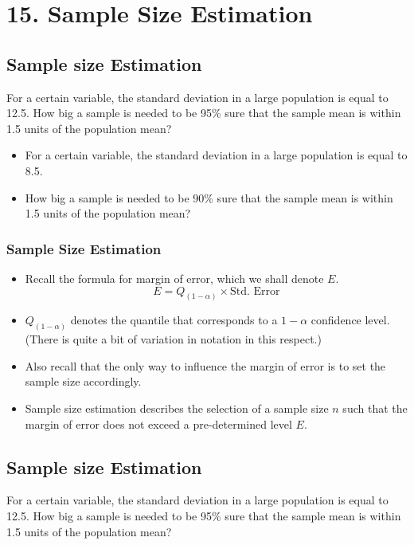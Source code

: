 \documentclass[]{report}
\begin{document}
\chapter{15. Sample Size Estimation}

\section{Sample size Estimation}
For a certain variable, the standard deviation in a large population is equal to 12.5.
How big a sample is needed to be 95\% sure that the sample mean is within 1.5 units of the population mean?


\begin{itemize}
\item For a certain variable, the standard deviation in a large population is equal to 8.5.
\item How big a sample is needed to be 90\% sure that the sample mean is within 1.5
units of the population mean?
\end{itemize}


\subsection{Sample Size Estimation}

\begin{itemize} \item Recall the formula for margin of error, which we shall denote $E$.
\[  E = Q_{(1-\alpha)} \times \mbox{Std. Error}\]

\item $Q_{(1-\alpha)}$ denotes the quantile that corresponds to a $1-\alpha$ confidence level. (There is quite a bit of variation in notation in this respect.)
\item Also recall that the only way to influence the margin of error is to set the sample size accordingly.

\item Sample size estimation describes the selection of a sample size $n$ such that the margin of error does not exceed a pre-determined level $E$.
\end{itemize}


\section{Sample size Estimation}
For a certain variable, the standard deviation in a large population is equal to 12.5.
How big a sample is needed to be 95\% sure that the sample mean is within 1.5 units of the population mean?
\end{document}
